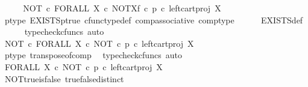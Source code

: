 \begin{isabellebody}
%
\endisadelimproof
%
\isatagproof
{}\isamarkupfalse%
\ {\isacharminus}{\kern0pt}\isanewline
\ \ \isamarkupfalse%
\ {\isachardoublequoteopen}NOT\ {\isasymcirc}\isactrlsub c\ FORALL\ X\ {\isasymcirc}\isactrlsub c\ NOT\isactrlbsup X\isactrlesup \isactrlsub f\ {\isasymcirc}\isactrlsub c\ {\isacharparenleft}{\kern0pt}p\ {\isasymcirc}\isactrlsub c\ left{\isacharunderscore}{\kern0pt}cart{\isacharunderscore}{\kern0pt}proj\ X\ {\isasymone}{\isacharparenright}{\kern0pt}\isactrlsup {\isasymsharp}\ {\isacharequal}{\kern0pt}\ {\isasymt}{\isachardoublequoteclose}\isanewline
\ \ \ \ \isamarkupfalse%
\ p{\isacharunderscore}{\kern0pt}type\ EXISTS{\isacharunderscore}{\kern0pt}p{\isacharunderscore}{\kern0pt}true\ cfunc{\isacharunderscore}{\kern0pt}type{\isacharunderscore}{\kern0pt}def\ comp{\isacharunderscore}{\kern0pt}associative\ comp{\isacharunderscore}{\kern0pt}type\isanewline
\ \ \ \ \isamarkupfalse%
\ EXISTS{\isacharunderscore}{\kern0pt}def\isanewline
\ \ \ \ \isamarkupfalse%
\ {\isacharparenleft}{\kern0pt}typecheck{\isacharunderscore}{\kern0pt}cfuncs{\isacharcomma}{\kern0pt}\ auto{\isacharparenright}{\kern0pt}\isanewline
\ \ \isamarkupfalse%
\ \isamarkupfalse%
\ {\isachardoublequoteopen}NOT\ {\isasymcirc}\isactrlsub c\ FORALL\ X\ {\isasymcirc}\isactrlsub c\ {\isacharparenleft}{\kern0pt}NOT\ {\isasymcirc}\isactrlsub c\ p\ {\isasymcirc}\isactrlsub c\ left{\isacharunderscore}{\kern0pt}cart{\isacharunderscore}{\kern0pt}proj\ X\ {\isasymone}{\isacharparenright}{\kern0pt}\isactrlsup {\isasymsharp}\ {\isacharequal}{\kern0pt}\ {\isasymt}{\isachardoublequoteclose}\isanewline
\ \ \ \ \isamarkupfalse%
\ p{\isacharunderscore}{\kern0pt}type\ transpose{\isacharunderscore}{\kern0pt}of{\isacharunderscore}{\kern0pt}comp\ \isamarkupfalse%
\ {\isacharparenleft}{\kern0pt}typecheck{\isacharunderscore}{\kern0pt}cfuncs{\isacharcomma}{\kern0pt}\ auto{\isacharparenright}{\kern0pt}\isanewline
\ \ \isamarkupfalse%
\ \isamarkupfalse%
\ {\isachardoublequoteopen}FORALL\ X\ {\isasymcirc}\isactrlsub c\ {\isacharparenleft}{\kern0pt}NOT\ {\isasymcirc}\isactrlsub c\ p\ {\isasymcirc}\isactrlsub c\ left{\isacharunderscore}{\kern0pt}cart{\isacharunderscore}{\kern0pt}proj\ X\ {\isasymone}{\isacharparenright}{\kern0pt}\isactrlsup {\isasymsharp}\ {\isasymnoteq}\ {\isasymt}{\isachardoublequoteclose}\isanewline
\ \ \ \ \isamarkupfalse%
\ NOT{\isacharunderscore}{\kern0pt}true{\isacharunderscore}{\kern0pt}is{\isacharunderscore}{\kern0pt}false\ true{\isacharunderscore}{\kern0pt}false{\isacharunderscore}{\kern0pt}distinct\ \isamarkupfalse%

\end{isabellebody}
